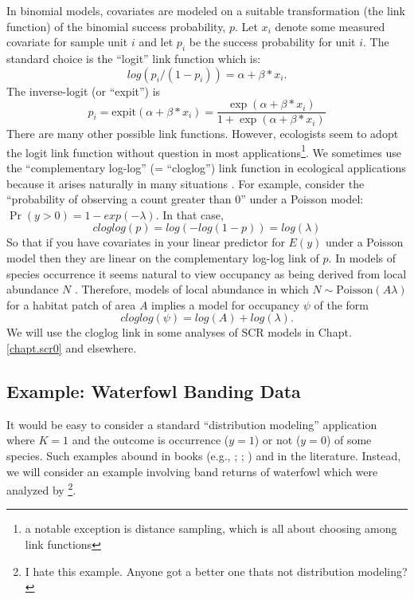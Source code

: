 In binomial models, covariates are modeled on a suitable
transformation (the link function) of the binomial success
probability, $p$.  Let $x_{i}$ denote some measured covariate for
sample unit $i$ and let $p_{i}$ be the success probability for unit $i$.
The standard choice is the ``logit'' link function which is:
\[
log(p_i/(1-p_i)) = \alpha + \beta*x_{i}.
\]
The inverse-logit (or ``expit'') is
\[
p_{i} = \mbox{expit}(\alpha + \beta*x_{i}) =
 \frac{ \exp(\alpha + \beta*x_{i})}
      {1 + \exp(\alpha + \beta*x_{i} ) }
\]
There are many other possible link functions. However, ecologists seem
to adopt the logit link function without question in most
applications\footnote{a notable exception is distance sampling, which
  is all about choosing among link functions}.  We sometimes use the
``complementary log-log'' (= ``cloglog'') link function in ecological
applications because it arises naturally in many situations
\citep[][p. 150]{royle_dorazio:2008}. For example, consider the
``probability of observing a count greater than 0'' under a Poisson
model: $\Pr(y>0) = 1-exp(- \lambda)$. In that case,
\[
cloglog(p) =log(- log(1-p)) = log(\lambda)
\]
So that if you have covariates in your linear predictor for $E(y)$
under a Poisson model then they are linear on the complementary
log-log link of $p$.
In models of species occurrence it seems natural to view occupancy as
being derived from local abundance $N$
\citep{royle_nichols:2003,royle_dorazio:2006,dorazio:2007}.
Therefore,
models of local abundance in which $N \sim \mbox{Poisson}(A \lambda)$
for a habitat patch of area $A$ implies a model for occupancy $\psi$
of the form
\[
 cloglog(\psi) = log(A) + log(\lambda).
\]
We will use the cloglog link in some analyses of
SCR models in Chapt. \ref{chapt.scr0} and elsewhere.


\subsection{ Example: Waterfowl Banding Data}

It would be easy to consider a standard ``distribution modeling''
application where $K=1$ and the outcome is occurrence ($y=1$) or not
($y=0$) of some species. Such examples abound in books (e.g.,
\citet[][ch. 3]{royle_dorazio:2008}; \citet[][ch. 21]{kery:2010};
\citet[][ch. 13]{kery_schaub:2011}) and in the literature.
Instead, we will
consider an example involving band returns of waterfowl which were
analyzed by \citet{royle_dubovsky:2001}\footnote{I hate this example.
  Anyone got a better one thats not distribution modeling?}.

